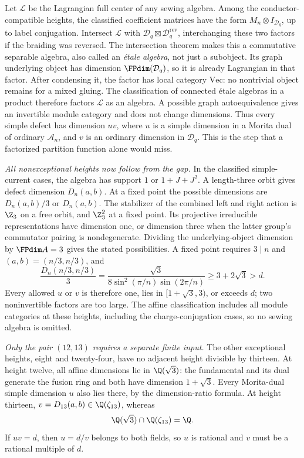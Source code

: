 Let $\mathcal L$ be the Lagrangian full center of any sewing algebra.
Among the conductor-compatible heights, the classified coefficient
matrices have the form $M_n\otimes I_{\mathcal D_q}$, up to label
conjugation. Intersect $\mathcal L$ with
$\mathcal D_q\boxtimes\mathcal D_q^{\mathrm{rev}}$, interchanging these
two factors if the braiding was reversed. The intersection
theorem makes this a commutative separable algebra, also called an
\emph{\'etale algebra}, not just a subobject.
Its graph underlying object has dimension $\FPdim(\mathcal D_q)$,
so it is already Lagrangian in that factor. After condensing it,
the factor has local category $\mathrm{Vec}$: no nontrivial object
remains for a mixed gluing. The classification of connected
\'etale algebras in a product therefore factors $\mathcal L$ as an
algebra. A possible graph autoequivalence gives an invertible module
category and does not change dimensions. Thus every simple defect has
dimension $uv$, where $u$ is a simple dimension in a Morita dual of
ordinary $\mathcal A_n$, and $v$ is an ordinary dimension in
$\mathcal D_q$. This is the step that a factorized partition function
alone would miss.

\emph{All nonexceptional heights now follow from the gap.}
In the classified simple-current cases, the algebra has support
$1$ or $1+J+J^2$. A length-three orbit gives defect dimension
$D_n(a,b)$. At a fixed point the possible dimensions are
$D_n(a,b)/3$ or $D_n(a,b)$. The stabilizer of the combined left and
right action is $\Z_3$ on a free orbit, and $\Z_3^2$ at a fixed
point. Its projective irreducible representations have dimension one,
or dimension three when the latter group's commutator pairing is
nondegenerate. Dividing the underlying-object dimension by
$\FPdim A=3$ gives the stated possibilities.
A fixed point requires $3\mid n$
and $(a,b)=(n/3,n/3)$, and
\[
 \frac{D_n(n/3,n/3)}3
 =\frac{\sqrt3}{8\sin^2(\pi/n)\sin(2\pi/n)}
 \geq3+2\sqrt3>d.
\]
Every allowed $u$ or $v$ is therefore one, lies in $[1+\sqrt3,3)$,
or exceeds $d$; two noninvertible factors are too large. The affine
classification includes all module categories at these heights,
including the charge-conjugation cases, so no sewing algebra is omitted.

\emph{Only the pair $(12,13)$ requires a separate finite input.}
The other exceptional heights, eight and twenty-four, have no adjacent
height divisible by thirteen. At height twelve, all affine dimensions
lie in $\Q(\sqrt3)$: the fundamental and its dual generate the fusion
ring and both have dimension $1+\sqrt3$. Every Morita-dual simple
dimension $u$ also lies there, by the dimension-ratio formula.
At height thirteen, $v=D_{13}(a,b)\in\Q(\zeta_{13})$, whereas
\[
 \Q(\sqrt3)\cap\Q(\zeta_{13})=\Q.
\]
If $uv=d$, then $u=d/v$ belongs to both fields, so $u$ is rational
and $v$ must be a rational multiple of $d$.

